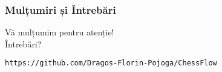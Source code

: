 \documentclass{beamer}
\begin{document}
\begin{frame}
    \frametitle{Mulțumiri și Întrebări}
    \begin{center}
        \Huge Vă mulțumim pentru atenție!
        \vspace{1cm} \\
        Întrebări?
        \vspace{0.5cm} \\
    \end{center}
    \begin{center}
        \faGithub \hspace{0.2em} \texttt{https://github.com/Dragos-Florin-Pojoga/ChessFlow}
    \end{center}
\end{frame}
\end{document}
